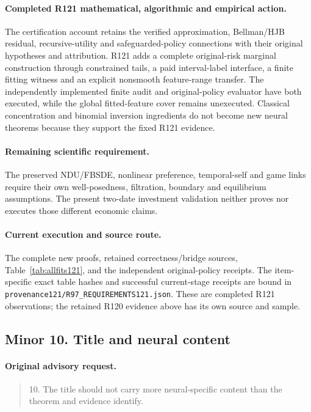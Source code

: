 \paragraph{Completed R121 mathematical, algorithmic and empirical action.}
The certification account retains the verified approximation, Bellman/HJB residual, recursive-utility and safeguarded-policy connections with their original hypotheses and attribution. R121 adds a complete original-risk marginal construction through constrained tails, a paid interval-label interface, a finite fitting witness and an explicit nonsmooth feature-range transfer. The independently implemented finite audit and original-policy evaluator have both executed, while the global fitted-feature cover remains unexecuted. Classical concentration and binomial inversion ingredients do not become new neural theorems because they support the fixed R121 evidence.

\paragraph{Remaining scientific requirement.}
The preserved NDU/FBSDE, nonlinear preference, temporal-self and game links require their own well-posedness, filtration, boundary and equilibrium assumptions. The present two-date investment validation neither proves nor executes those different economic claims.

\paragraph{Current execution and source route.}
The complete new proofs, retained correctness/bridge sources, Table~\ref{tab:allfits121}, and the independent original-policy receipts.
The item-specific exact table hashes and successful current-stage receipts are bound in \nolinkurl{provenance121/R97_REQUIREMENTS121.json}. These are completed R121 observations; the retained R120 evidence above has its own source and sample.

\subsection{Minor 10. Title and neural content}
\label{response121:minor-10}

\paragraph{Original advisory request.}
\begin{quote}
10. The title should not carry more neural-specific content than the theorem and evidence identify.
\end{quote}

